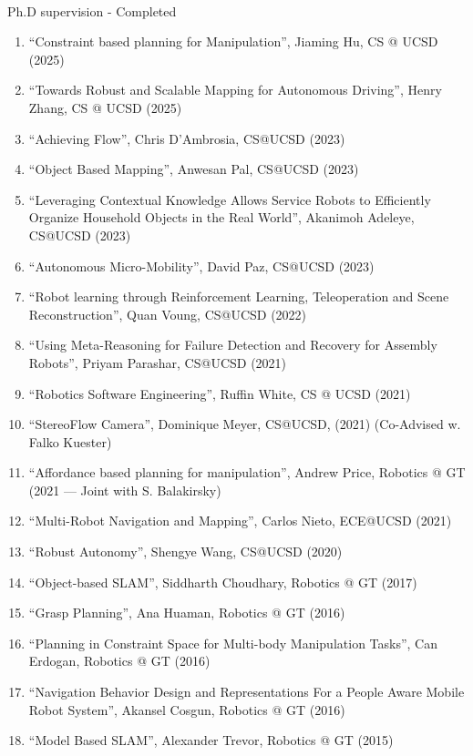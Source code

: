 \documentclass{article}
\begin{document}
\begin{cv}
\begin{cvlist}{~}
		\item[Ph.D supervision - Completed]\ \\
		\begin{enumerate}
			\item ``Constraint based planning for Manipulation'', Jiaming Hu, CS @ UCSD (2025)
			\item ``Towards Robust and Scalable Mapping for Autonomous Driving'', Henry Zhang, CS @  UCSD (2025)
			\item ``Achieving Flow'', Chris D'Ambrosia, CS@UCSD (2023)
			\item ``Object Based Mapping'', Anwesan Pal, CS@UCSD (2023)
			\item ``Leveraging Contextual Knowledge Allows Service Robots to Efficiently
			      Organize Household Objects in the Real World'', Akanimoh Adeleye,
			      CS@UCSD (2023)
			\item ``Autonomous Micro-Mobility'', David Paz, CS@UCSD (2023)
			\item ``Robot learning through Reinforcement Learning, Teleoperation
			      and Scene Reconstruction'', Quan Voung, CS@UCSD (2022)
			\item ``Using Meta-Reasoning for Failure Detection and Recovery for
			      Assembly Robots'', Priyam Parashar, CS@UCSD (2021)
			\item ``Robotics Software Engineering'', Ruffin White, CS @ UCSD (2021)
			\item ``StereoFlow Camera'', Dominique Meyer, CS@UCSD, (2021)
			      (Co-Advised w. Falko Kuester)
			\item ``Affordance based planning for manipulation'', Andrew Price, Robotics
			      @ GT (2021 --- Joint with S. Balakirsky)
			\item ``Multi-Robot Navigation and Mapping'', Carlos Nieto, ECE@UCSD (2021)
			\item ``Robust Autonomy'', Shengye Wang, CS@UCSD (2020)
			\item ``Object-based SLAM'', Siddharth Choudhary, Robotics @ GT (2017)
			\item ``Grasp Planning'', Ana Huaman, Robotics @ GT (2016)
			\item ``Planning in Constraint Space for Multi-body Manipulation Tasks'',
			      Can Erdogan, Robotics @ GT (2016)
			\item ``Navigation Behavior Design and Representations For a People Aware
			      Mobile Robot System'', Akansel Cosgun, Robotics @ GT (2016)
			\item ``Model Based SLAM'', Alexander Trevor, Robotics @ GT (2015)

\end{enumerate}
\end{cvlist}
\end{cv}
\end{document}
